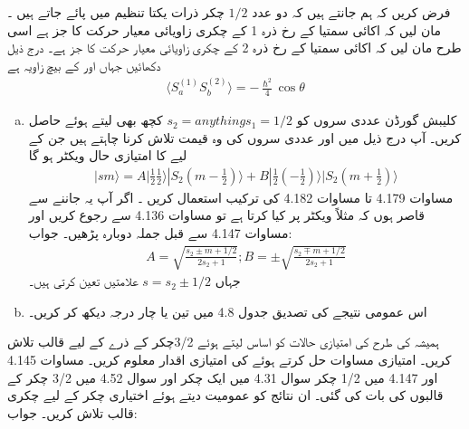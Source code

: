 فرض کریں کہ ہم جانتے ہیں کہ دو عدد \( 1/2 \) چکر ذرات یکتا تنظیم   میں پائے جاتے ہیں ۔مان لیں کہ اکائی سمتیا  کے رخ ذرہ 1 کے چکری زاویائی معیار حرکت کا جز  ہے اسی طرح مان لیں کہ اکائی سمتیا   کے رخ ذرہ 2 کے چکری زاویائی معیار حرکت کا جز  ہے۔ درج ذیل دکھائیں جہاں  اور  کے بیچ زاویہ  ہے 
\begin{align}
    \langle S_{a}^{(1)}S_{b}^{(2)}\rangle=-\frac{\hslash^{2}}{4}\cos\theta
\end{align}
\begin{enumerate}[a.]
\item     کلیبش گورڈن عددی سروں کو \( s_1=1/2\)\( s_2=any thing\) کچھ بھی لیتے ہوئے حاصل کریں۔ آپ درج ذیل میں  اور  عددی سروں کی وہ قیمت تلاش کرنا چاہتے ہیں جن کے لیے  کا امتیازی حال ویکٹر  ہو گا 
\begin{align*}
    |sm \rangle=A|\frac{1}{2}\frac{1}{2}\rangle|S_2(m-\frac{1}{2})\rangle+B|\frac{1}{2}(-\frac{1}{2})\rangle|S_2(m+\frac{1}{2})\rangle
\end{align*} 
مساوات 4.179 تا مساوات 4.182 کی ترکیب استعمال کریں ۔ اگر آپ یہ جاننے سے قاصر ہوں کہ  مثلاً ویکٹر  پر کیا کرتا ہے تو مساوات 4.136 سے رجوع کریں اور مساوات 4.147  سے قبل جملہ دوبارہ پڑھیں۔ جواب:
\begin{align*}
    A=\sqrt{\frac{s_2\pm m+1/2}{2s_2+1}}; 
     B=\pm \sqrt{\frac{s_2\mp m+1/2}{2s_2+1}} 
\end{align*}
جہاں  \( s=s_2\pm1/2 \)  علامتیں تعین کرتی ہیں۔
\item اس عمومی نتیجے کی تصدیق جدول 4.8 میں تین یا چار درجہ دیکھ کر کریں۔
\end{enumerate}
ہمیشہ کی طرح  کی امتیازی حالات کو اساس لیتے ہوئے 3/2چکر کے ذرے کے لیے قالب  تلاش کریں۔ امتیازی مساوات حل کرتے ہوئے  کی امتیازی اقدار معلوم کریں۔
مساوات 4.145 اور 4.147 میں 1/2 چکر سوال 4.31 میں ایک چکر اور سوال 4.52 میں 3/2 چکر کے قالبوں کی بات کی گئی۔ ان نتائج کو عمومیت دیتے ہوئے اختیاری  چکر کے لیے چکری قالب تلاش کریں۔
جواب:
